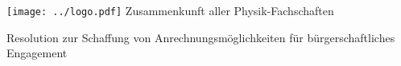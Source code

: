 \documentclass[DIV=calc]{scrartcl}
\begin{document}
\hspace{0.87\textwidth}
\begin{minipage}{120pt}
	\vspace{-1.8cm}
	\texttt{[image: ../logo.pdf]}
	\centering
	\small Zusammenkunft aller Physik-Fachschaften
\end{minipage}

\begin{center}
  \huge{Resolution zur Schaffung von Anrechnungsmöglichkeiten für bürgerschaftliches Engagement}\vspace{.25\baselineskip}\\
  \normalsize
\end{center}
\vspace{1cm}





\end{document}
